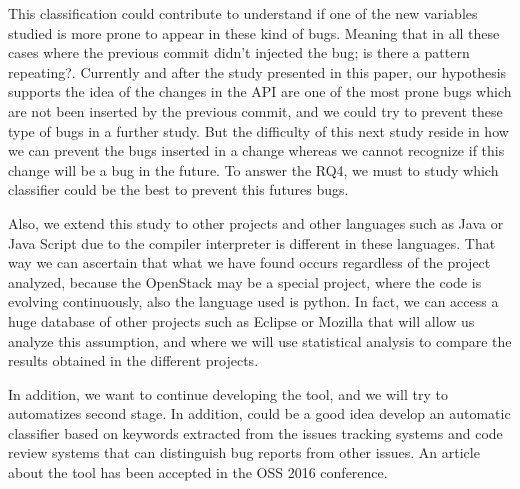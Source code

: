 \documentclass[ifip]{svmult}
\begin{document}
This classification could contribute to understand if one of the new variables studied is more prone to appear in these kind of bugs. Meaning that in all these cases where the previous commit didn't injected the bug; is there a pattern repeating?. Currently and after the study presented in this paper, our hypothesis supports the idea of the changes in the API are one of the most prone bugs which are not been inserted by the previous commit, and we could try to prevent these type of bugs in a further study. But the difficulty of this next study reside in how we can prevent the bugs inserted in a change whereas we cannot recognize if this change will be a bug in the future. To answer the RQ4, we must to study which classifier could be the best to prevent this futures bugs.

Also, we extend this study to other projects and other languages such as Java or Java Script due to the compiler interpreter is different in these languages. That way we can ascertain that what we have found occurs regardless of the project analyzed, because the OpenStack may be a special project, where the code is evolving continuously, also the language used is python. In fact, we can access a huge database of other projects such as Eclipse or Mozilla that will allow us analyze this assumption, and where we will use statistical analysis to compare the results obtained in the different projects. 

In addition, we want to continue developing the tool, and we will try to automatizes second stage. In addition, could be a good idea develop an automatic classifier based on keywords extracted from the issues tracking systems and code review systems that can distinguish bug reports from other issues. An article about the tool has been accepted in the OSS 2016 conference.



\end{document}
